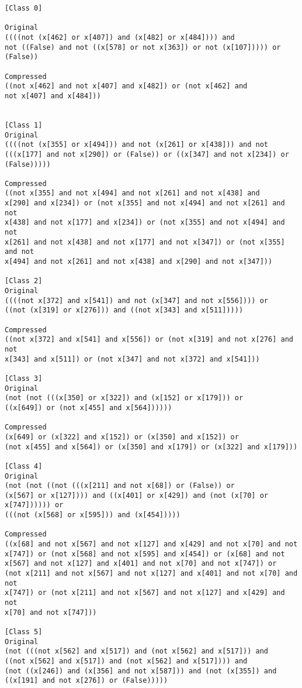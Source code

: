 \begin{verbatim}
[Class 0]

Original
((((not (x[462] or x[407]) and (x[482] or x[484]))) and 
not ((False) and not ((x[578] or not x[363]) or not (x[107])))) or (False))

Compressed
((not x[462] and not x[407] and x[482]) or (not x[462] and 
not x[407] and x[484]))


[Class 1]
Original   
((((not (x[355] or x[494])) and not (x[261] or x[438])) and not 
(((x[177] and not x[290]) or (False)) or ((x[347] and not x[234]) or (False)))))

Compressed 
((not x[355] and not x[494] and not x[261] and not x[438] and 
x[290] and x[234]) or (not x[355] and not x[494] and not x[261] and not 
x[438] and not x[177] and x[234]) or (not x[355] and not x[494] and not 
x[261] and not x[438] and not x[177] and not x[347]) or (not x[355] and not 
x[494] and not x[261] and not x[438] and x[290] and not x[347]))

[Class 2]
Original
((((not x[372] and x[541]) and not (x[347] and not x[556]))) or 
((not (x[319] or x[276])) and ((not x[343] and x[511]))))

Compressed
((not x[372] and x[541] and x[556]) or (not x[319] and not x[276] and not 
x[343] and x[511]) or (not x[347] and not x[372] and x[541]))

[Class 3]
Original
(not (not (((x[350] or x[322]) and (x[152] or x[179])) or 
((x[649]) or (not x[455] and x[564])))))

Compressed
(x[649] or (x[322] and x[152]) or (x[350] and x[152]) or 
(not x[455] and x[564]) or (x[350] and x[179]) or (x[322] and x[179]))

[Class 4]
Original  
(not (not ((not (((x[211] and not x[68]) or (False)) or 
(x[567] or x[127]))) and ((x[401] or x[429]) and (not (x[70] or x[747]))))) or 
(((not (x[568] or x[595])) and (x[454]))))

Compressed
((x[68] and not x[567] and not x[127] and x[429] and not x[70] and not 
x[747]) or (not x[568] and not x[595] and x[454]) or (x[68] and not 
x[567] and not x[127] and x[401] and not x[70] and not x[747]) or 
(not x[211] and not x[567] and not x[127] and x[401] and not x[70] and not 
x[747]) or (not x[211] and not x[567] and not x[127] and x[429] and not 
x[70] and not x[747]))

[Class 5]
Original
(not (((not x[562] and x[517]) and (not x[562] and x[517])) and 
((not x[562] and x[517]) and (not x[562] and x[517]))) and 
(not ((x[246]) and (x[356] and not x[587])) and (not (x[355]) and 
((x[191] and not x[276]) or (False)))))


\end{verbatim}

